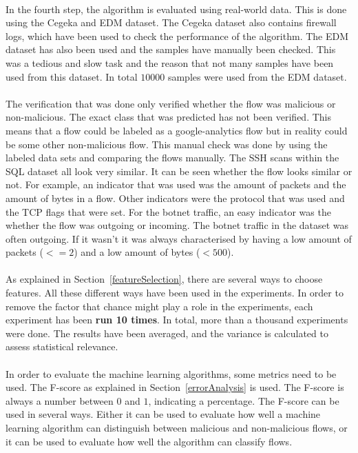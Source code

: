 \\
In the fourth step, the algorithm is evaluated using real-world data. This is done using the Cegeka and EDM dataset. The Cegeka dataset also contains firewall logs, which have been used to check the performance of the algorithm. The EDM dataset has also been used and the samples have manually been checked. This was a tedious and slow task and the reason that not many samples have been used from this dataset. In total $10000$ samples were used from the EDM dataset. \\
\\
The verification that was done only verified whether the flow was malicious or non-malicious. The exact class that was predicted has not been verified. This means that a flow could be labeled as a google-analytics flow but in reality could be some other non-malicious flow. This manual check was done by using the labeled data sets and comparing the flows manually. The SSH scans within the SQL dataset all look very similar. It can be seen whether the flow looks similar or not. For example, an indicator that was used was the amount of packets and the amount of bytes in a flow. Other indicators were the protocol that was used and the TCP flags that were set. For the botnet traffic, an easy indicator was the whether the flow was outgoing or incoming. The botnet traffic in the dataset was often outgoing. If it wasn't it was always characterised by having a low amount of packets ($ <= 2$) and a low amount of bytes ($ < 500 $).\\
\\
As explained in Section~\ref{featureSelection}, there are several ways to choose features. All these different ways have been used in the experiments. In order to remove the factor that chance might play a role in the experiments, each experiment has been \textbf{run 10 times}. In total, more than a thousand experiments were done. The results have been averaged, and the variance is calculated to assess statistical relevance.\\
\\
In order to evaluate the machine learning algorithms, some metrics need to be used. The F-score as explained in Section~\ref{errorAnalysis} is used. The F-score is always a number between $0$ and $1$, indicating a percentage. The F-score can be used in several ways. Either it can be used to evaluate how well a machine learning algorithm can distinguish between malicious and non-malicious flows, or it can be used to evaluate how well the algorithm can classify flows.\\
